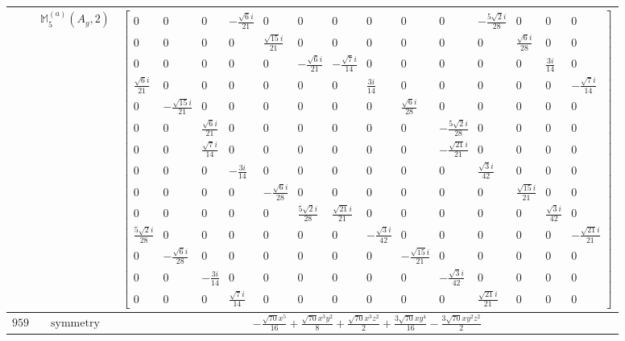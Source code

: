 \documentclass[fleqn,8pt,landscape]{jsarticle}
\begin{document}
\begin{longtable}{ccc}
$  $ & $ \mathbb{M}_{5}^{(a)}(A_{g},2) $ & $ \begin{bmatrix} 0 & 0 & 0 & - \frac{\sqrt{6} i}{21} & 0 & 0 & 0 & 0 & 0 & 0 & - \frac{5 \sqrt{2} i}{28} & 0 & 0 & 0 \\ 0 & 0 & 0 & 0 & \frac{\sqrt{15} i}{21} & 0 & 0 & 0 & 0 & 0 & 0 & \frac{\sqrt{6} i}{28} & 0 & 0 \\ 0 & 0 & 0 & 0 & 0 & - \frac{\sqrt{6} i}{21} & - \frac{\sqrt{7} i}{14} & 0 & 0 & 0 & 0 & 0 & \frac{3 i}{14} & 0 \\ \frac{\sqrt{6} i}{21} & 0 & 0 & 0 & 0 & 0 & 0 & \frac{3 i}{14} & 0 & 0 & 0 & 0 & 0 & - \frac{\sqrt{7} i}{14} \\ 0 & - \frac{\sqrt{15} i}{21} & 0 & 0 & 0 & 0 & 0 & 0 & \frac{\sqrt{6} i}{28} & 0 & 0 & 0 & 0 & 0 \\ 0 & 0 & \frac{\sqrt{6} i}{21} & 0 & 0 & 0 & 0 & 0 & 0 & - \frac{5 \sqrt{2} i}{28} & 0 & 0 & 0 & 0 \\ 0 & 0 & \frac{\sqrt{7} i}{14} & 0 & 0 & 0 & 0 & 0 & 0 & - \frac{\sqrt{21} i}{21} & 0 & 0 & 0 & 0 \\ 0 & 0 & 0 & - \frac{3 i}{14} & 0 & 0 & 0 & 0 & 0 & 0 & \frac{\sqrt{3} i}{42} & 0 & 0 & 0 \\ 0 & 0 & 0 & 0 & - \frac{\sqrt{6} i}{28} & 0 & 0 & 0 & 0 & 0 & 0 & \frac{\sqrt{15} i}{21} & 0 & 0 \\ 0 & 0 & 0 & 0 & 0 & \frac{5 \sqrt{2} i}{28} & \frac{\sqrt{21} i}{21} & 0 & 0 & 0 & 0 & 0 & \frac{\sqrt{3} i}{42} & 0 \\ \frac{5 \sqrt{2} i}{28} & 0 & 0 & 0 & 0 & 0 & 0 & - \frac{\sqrt{3} i}{42} & 0 & 0 & 0 & 0 & 0 & - \frac{\sqrt{21} i}{21} \\ 0 & - \frac{\sqrt{6} i}{28} & 0 & 0 & 0 & 0 & 0 & 0 & - \frac{\sqrt{15} i}{21} & 0 & 0 & 0 & 0 & 0 \\ 0 & 0 & - \frac{3 i}{14} & 0 & 0 & 0 & 0 & 0 & 0 & - \frac{\sqrt{3} i}{42} & 0 & 0 & 0 & 0 \\ 0 & 0 & 0 & \frac{\sqrt{7} i}{14} & 0 & 0 & 0 & 0 & 0 & 0 & \frac{\sqrt{21} i}{21} & 0 & 0 & 0 \end{bmatrix} $ \\ \hline
$ 959 $ & $ \text{symmetry} $ & $ - \frac{\sqrt{70} x^{5}}{16} + \frac{\sqrt{70} x^{3} y^{2}}{8} + \frac{\sqrt{70} x^{3} z^{2}}{2} + \frac{3 \sqrt{70} x y^{4}}{16} - \frac{3 \sqrt{70} x y^{2} z^{2}}{2} $ \\

\end{longtable}
\end{document}
